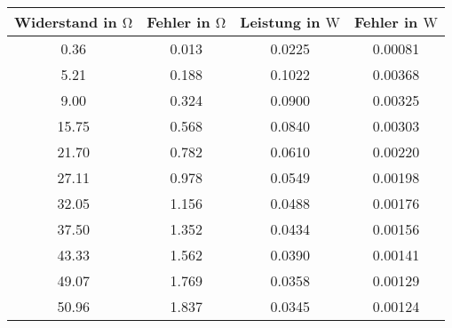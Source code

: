 \begin{tabular}{c|c||c|c}
Widerstand in $\si{\ohm}$ & Fehler in $\si{\ohm}$ & Leistung in $\si{\watt}$ & Fehler in $\si{\watt}$ \\
\hline
  0.36  & 0.013  & 0.0225   & 0.00081  \\
  5.21  & 0.188  & 0.1022   & 0.00368  \\
  9.00  & 0.324  & 0.0900   & 0.00325  \\
 15.75  & 0.568  & 0.0840   & 0.00303  \\
 21.70  & 0.782  & 0.0610   & 0.00220  \\
 27.11  & 0.978  & 0.0549   & 0.00198  \\
 32.05  & 1.156  & 0.0488   & 0.00176  \\
 37.50  & 1.352  & 0.0434   & 0.00156  \\
 43.33  & 1.562  & 0.0390   & 0.00141  \\
 49.07  & 1.769  & 0.0358   & 0.00129  \\
 50.96  & 1.837  & 0.0345   & 0.00124  \\
\end{tabular}